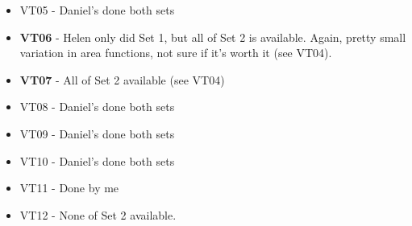 \documentclass{article}
\begin{document}
\begin{itemize}
    \item VT05 - Daniel's done both sets
    \item \textbf{VT06} - Helen only did Set 1, but all of Set 2 is available. Again, pretty small variation in area functions, not sure if it's worth it (see VT04).
    \item \textbf{VT07} - All of Set 2 available (see VT04)
    \item VT08 - Daniel's done both sets
    \item VT09 - Daniel's done both sets
    \item VT10 - Daniel's done both sets
    \item VT11 - Done by me
    \item VT12 - None of Set 2 available.
\end{itemize}
\end{document}
